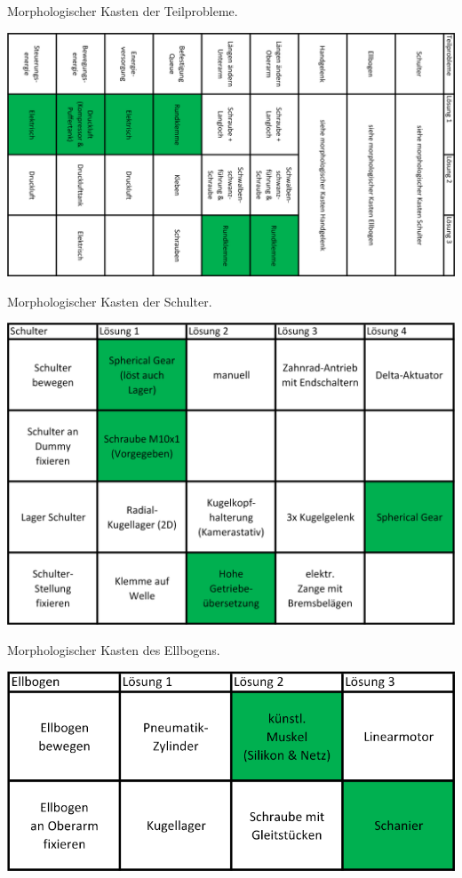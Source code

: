 			\begin{table}[h]
				\centering
				\caption[Morphologischer Kasten der Teilprobleme]{Morphologischer Kasten der Teilprobleme.}
				\includegraphics[angle=90, width=.8\textwidth]{Abb/MorphoBoxes/Morphologischer_Kasten_Teilprobleme.png}\label{tab:morphologische-kasten-teilprobleme}
			\end{table}
%
			\begin{table}[h]
				\centering
				\caption[Morphologischer Kasten der Schulter]{Morphologischer Kasten der Schulter.}
				\includegraphics[width=.8\textwidth]{Abb/MorphoBoxes/Morphologischer_Kasten_Schulter.png}\label{tab:morphologische-kasten-schulter}
			\end{table}
%
			\begin{table}[h]
				\centering
				\caption[Morphologischer Kasten des Ellbogens]{Morphologischer Kasten des Ellbogens.}
				\includegraphics[width=.8\textwidth]{Abb/MorphoBoxes/Morphologischer_Kasten_Ellbogen.png}\label{tab:morphologische-kasten-ellbogen}
			\end{table}

